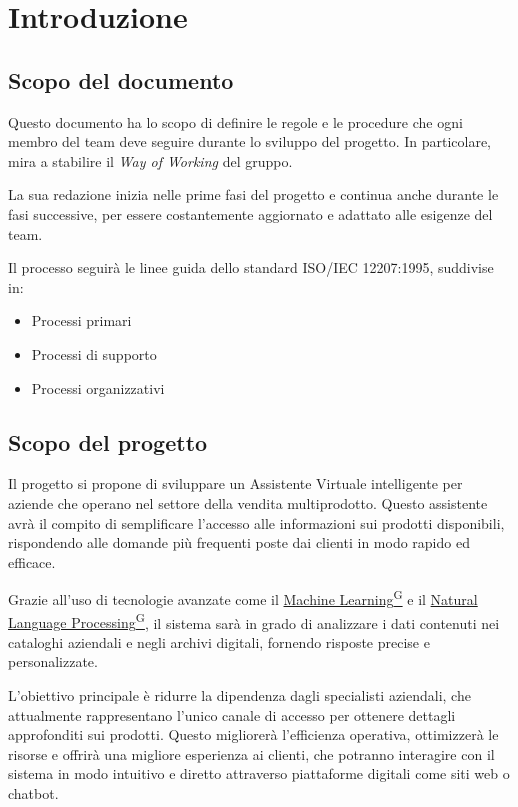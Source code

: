 \section{Introduzione}

\subsection{Scopo del documento}
Questo documento ha lo scopo di definire le regole e le procedure che ogni membro del team deve seguire durante 
lo sviluppo del progetto. In particolare, mira a stabilire il \textit{Way of Working} del gruppo. 

La sua redazione inizia nelle prime fasi del progetto e continua anche durante le fasi successive, 
per essere costantemente aggiornato e adattato alle esigenze del team. 

Il processo seguirà le linee guida dello standard ISO/IEC 12207:1995, suddivise in:
\begin{itemize}
    \item Processi primari
    \item Processi di supporto
    \item Processi organizzativi
\end{itemize}


\subsection{Scopo del progetto}
Il progetto si propone di sviluppare un Assistente Virtuale intelligente per aziende che operano nel 
settore della vendita multiprodotto. Questo assistente avrà il compito di semplificare l'accesso alle 
informazioni sui prodotti disponibili, rispondendo alle domande più frequenti poste dai clienti in modo rapido ed efficace.

Grazie all'uso di tecnologie avanzate come il \href{https://code7crusaders.github.io/docs/RTB/documentazione_interna/glossario.html#machine-learning}{Machine Learning\textsuperscript{G}} e il \href{https://code7crusaders.github.io/docs/RTB/documentazione_interna/glossario.html#natural-language-processing-nlp}{Natural Language Processing\textsuperscript{G}}, 
il sistema sarà in grado di analizzare i dati contenuti nei cataloghi aziendali e negli archivi digitali, 
fornendo risposte precise e personalizzate.

L’obiettivo principale è ridurre la dipendenza dagli specialisti aziendali, che attualmente rappresentano 
l’unico canale di accesso per ottenere dettagli approfonditi sui prodotti. Questo migliorerà l’efficienza 
operativa, ottimizzerà le risorse e offrirà una migliore esperienza ai clienti, che potranno interagire con 
il sistema in modo intuitivo e diretto attraverso piattaforme digitali come siti web o chatbot.

